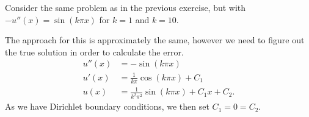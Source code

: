 \begin{exercise}
    Consider the same problem as in the previous exercise, but with $ -u''(x) = \sin(k\pi x)$ for $k = 1$ and $k = 10$.
\end{exercise}

\begin{solution}
    The approach for this is approximately the same, however we need to figure out the true solution in order to calculate the error.
    \begin{align*}
        u''(x) &= -\sin(k\pi x) \\
        u'(x) &= \frac{1}{k\pi} \cos(k\pi x) + C_1 \\
        u(x) &= \frac{1}{k^2\pi^2} \sin(k\pi x) + C_1 x + C_2.
    \end{align*}
    As we have Dirichlet boundary conditions, we then set $C_1 = 0 = C_2$.
\end{solution}